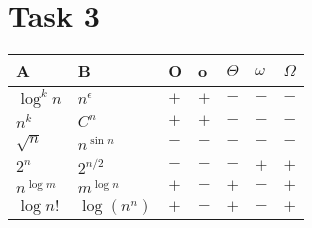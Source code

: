\section{Task 3}
\begin{tabularx}{\textwidth}{X|X|XXXXX}
    \toprule
    A & B & O & o & $\Theta$ & $\omega$ & $\Omega$ \\
    \midrule
    $\log^kn$ & $n^{\epsilon}$ & $+$ & $+$ & $-$ & $-$ & $-$ \\
    $n^k$ & $C^n$ & $+$ & $+$ & $-$ & $-$ & $-$ \\
    $\sqrt{n}$ & $n^{\sin n}$ & $-$ & $-$ & $-$ & $-$ & $-$ \\
    $2^n$ & $2^{n/2}$ & $-$ & $-$ & $-$ & $+$ & $+$ \\
    $n^{\log m}$ & $m^{\log n}$ & $+$ & $-$ & $+$ & $-$ & $+$ \\
    $\log n!$ & $\log(n^n)$ & $+$ & $-$ & $+$ & $-$ & $+$ \\
    \bottomrule
\end{tabularx}

